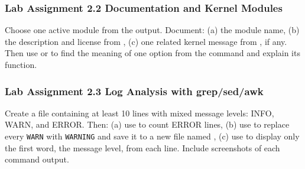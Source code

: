 \subsubsection*{Lab Assignment 2.2 Documentation and Kernel Modules}
Choose one active module from the  output. Document: (a) the module name, (b) the description and license from , (c) one related kernel message from , if any. Then use  or  to find the meaning of one option from the  command and explain its function.


\subsubsection*{Lab Assignment 2.3 Log Analysis with grep/sed/awk}
Create a  file containing at least 10 lines with mixed message levels: INFO, WARN, and ERROR. Then: (a) use  to count ERROR lines, (b) use  to replace every \texttt{WARN} with \texttt{WARNING} and save it to a new file named , (c) use  to display only the first word, the message level, from each line. Include screenshots of each command output.


%
